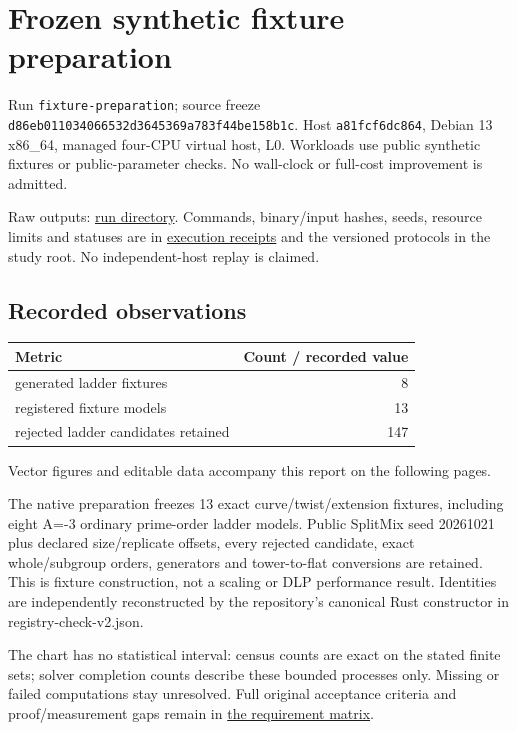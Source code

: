\documentclass[
  10pt,
  letterpaper,
  landscape]{article}
\author{}
\date{}
\begin{document}
\section{Frozen synthetic fixture
preparation}\label{frozen-synthetic-fixture-preparation}

Run \texttt{fixture-preparation}; source freeze
\texttt{d86eb011034066532d3645369a783f44be158b1c}. Host
\texttt{a81fcf6dc864}, Debian 13 x86\_64, managed four-CPU virtual host,
L0. Workloads use public synthetic fixtures or public-parameter checks.
No wall-clock or full-cost improvement is admitted.

Raw outputs: \href{../../../execution-v1/}{run directory}. Commands,
binary/input hashes, seeds, resource limits and statuses are in
\href{../../../execution-v1/}{execution receipts} and the versioned
protocols in the study root. No independent-host replay is claimed.

\subsection{Recorded observations}\label{recorded-observations}

\begin{longtable}[]{@{}lr@{}}
\toprule\noalign{}
Metric & Count / recorded value \\
\midrule\noalign{}
\endhead
\bottomrule\noalign{}
\endlastfoot
generated ladder fixtures & 8 \\
registered fixture models & 13 \\
rejected ladder candidates retained & 147 \\
\end{longtable}

Vector figures and editable data accompany this report on the following pages.

The native preparation freezes 13 exact curve/twist/extension fixtures,
including eight A=-3 ordinary prime-order ladder models. Public SplitMix
seed 20261021 plus declared size/replicate offsets, every rejected
candidate, exact whole/subgroup orders, generators and tower-to-flat
conversions are retained. This is fixture construction, not a scaling or
DLP performance result. Identities are independently reconstructed by
the repository's canonical Rust constructor in registry-check-v2.json.

The chart has no statistical interval: census counts are exact on the
stated finite sets; solver completion counts describe these bounded
processes only. Missing or failed computations stay unresolved. Full
original acceptance criteria and proof/measurement gaps remain in
\href{../../../EXPERIMENTS.md}{the requirement matrix}.
\end{document}
